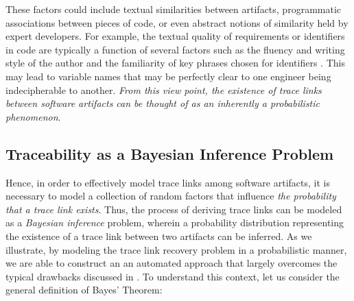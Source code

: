 These factors could include textual similarities between artifacts, programmatic associations between pieces of code, or even abstract notions of similarity held by expert developers.  For example, the textual quality of requirements or identifiers in code are typically a function of several factors such as the fluency and writing style of the author and the familiarity of key phrases chosen for identifiers \citep{Dasgupta:ICSME'13}. This may lead to variable names that may be perfectly clear to one engineer being indecipherable to another.  \textit{From this view point, the existence of trace links between software artifacts can be thought of as an inherently a probabilistic phenomenon}.

\subsection{Traceability as a Bayesian Inference Problem}

Hence, in order to effectively model trace links among software artifacts, it is necessary to model a collection of random factors that influence \textit{the probability that a trace link exists}. Thus, the process of deriving trace links can be modeled as a \textit{Bayesian inference} problem, wherein a probability distribution representing the existence of a trace link between two artifacts can be inferred. As we illustrate, by modeling the trace link recovery problem in a probabilistic manner, we are able to construct an an automated approach that largely overcomes the typical drawbacks discussed in  . To understand this context, let us consider the general definition of Bayes' Theorem:


